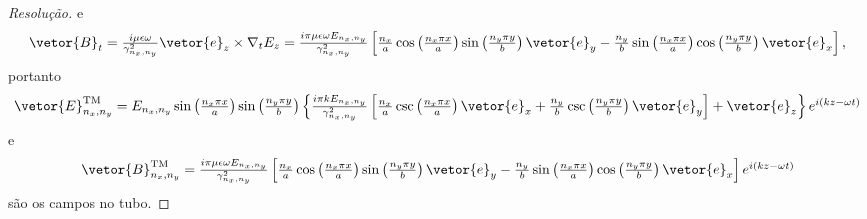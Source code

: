 \begin{proof}[Resolução]
    e
    \begin{equation*}
        \textstyle
        \vetor{B}_t = \frac{i \mu \epsilon \omega}{\gamma^2_{n_x, n_y}} \vetor{e}_z \times \nabla_t E_z = \frac{i \pi \mu \epsilon \omega E_{n_x, n_y}}{\gamma^2_{n_x, n_y}}\left[\frac{n_x}{a}\cos\left(\frac{n_x \pi x}{a}\right)\sin\left(\frac{n_y \pi y}{b}\right)\vetor{e}_y - \frac{n_y}{b}\sin\left(\frac{n_x \pi x}{a}\right)\cos\left(\frac{n_y \pi y}{b}\right)\vetor{e}_x\right],
    \end{equation*}
    portanto
    \begin{equation*}
        \textstyle
        \vetor{E}^\mathrm{TM}_{n_x, n_y} = E_{n_x, n_y} \sin \left(\frac{n_x \pi x}{a}\right)\sin\left(\frac{n_y \pi y}{b}\right)\left\{\frac{i \pi k E_{n_x, n_y}}{\gamma^2_{n_x, n_y}}\left[\frac{n_x}{a}\csc\left(\frac{n_x \pi x}{a}\right)\vetor{e}_x + \frac{n_y}{b}\csc\left(\frac{n_y \pi y}{b}\right)\vetor{e}_y\right] + \vetor{e}_z\right\}e^{i(kz - \omega t)}
    \end{equation*}
    e
    \begin{equation*}
        \textstyle
        \vetor{B}^\mathrm{TM}_{n_x, n_y} = \frac{i \pi \mu \epsilon \omega E_{n_x, n_y}}{\gamma^2_{n_x, n_y}}\left[\frac{n_x}{a}\cos\left(\frac{n_x \pi x}{a}\right)\sin\left(\frac{n_y \pi y}{b}\right)\vetor{e}_y - \frac{n_y}{b}\sin\left(\frac{n_x \pi x}{a}\right)\cos\left(\frac{n_y \pi y}{b}\right)\vetor{e}_x\right] e^{i(kz - \omega t)}
    \end{equation*}
    são os campos no tubo.
\end{proof}
